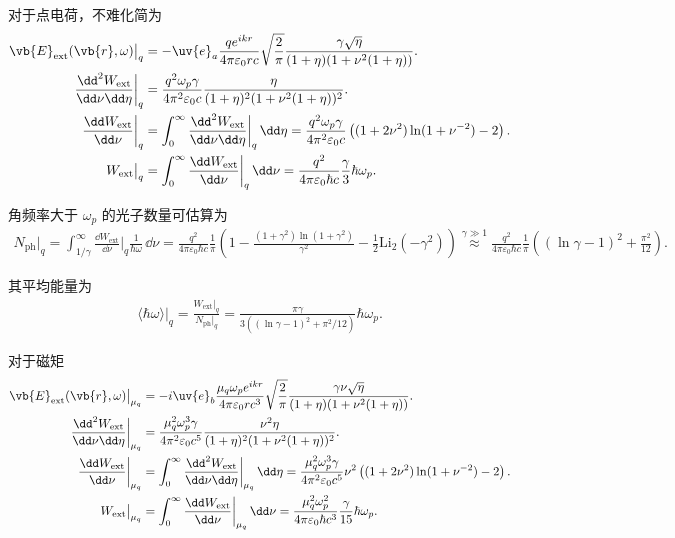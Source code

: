 对于点电荷，不难化简为
\begin{align*}
	\vb{E}_{\mathrm{ext}}(\vb{r}, \omega)\big|_{q} &= -\uv{e}_{a} \frac{q e^{i k r}}{4\pi \varepsilon_{0} r c} \sqrt{\frac{2}{\pi}} \frac{\gamma \sqrt{\eta}}{(1 + \eta) (1 + \nu^{2} (1 + \eta))}.\\\frac{\dd^{2} W_{\mathrm{ext}}}{\dd \nu \dd \eta}\bigg|_{q} &= \frac{q^{2} \omega_{p} \gamma}{4\pi^{2} \varepsilon_{0} c} \frac{\eta}{(1 + \eta)^{2} (1 + \nu^{2} (1 + \eta))^{2}}.\\\frac{\dd  W_{\mathrm{ext}}}{\dd \nu}\bigg|_{q} &= \int_{0}^{\infty} \frac{\dd^{2} W_{\mathrm{ext}}}{\dd \nu \dd \eta}\bigg|_{q} \, \dd \eta = \frac{q^{2} \omega_{p} \gamma}{4\pi^{2} \varepsilon_{0} c} \left( (1 + 2\nu^{2}) \ln(1 + \nu^{-2}) - 2 \right).\\W_{\mathrm{ext}}\big|_{q} &= \int_{0}^{\infty} \frac{\dd  W_{\mathrm{ext}}}{\dd \nu}\bigg|_{q} \, \dd \nu = \frac{q^{2}}{4\pi \varepsilon_{0} \hbar c} \frac{\gamma}{3} \hbar \omega_{p}.
\end{align*}

角频率大于 \(\omega_{p}\) 的光子数量可估算为
\begin{align*}
	N_{\mathrm{ph}}\big|_{q} = \int_{1/\gamma}^{\infty} \frac{\dd  W_{\mathrm{ext}}}{\dd \nu}\bigg|_{q} \frac{1}{\hbar \omega} \, \dd \nu = \frac{q^{2}}{4\pi \varepsilon_{0} \hbar c} \frac{1}{\pi} \left( 1 - \frac{(1 + \gamma^{2}) \ln(1 + \gamma^{2})}{\gamma^{2}} - \frac{1}{2} \mathrm{Li}_{2}(-\gamma^{2}) \right) \overset{\gamma \gg 1}{\approx} \frac{q^{2}}{4\pi \varepsilon_{0} \hbar c} \frac{1}{\pi} \left( (\ln \gamma - 1)^{2} + \frac{\pi^{2}}{12} \right).
\end{align*}

其平均能量为
\begin{align*}
	\langle \hbar\omega \rangle\big|_{q} = \frac{W_{\mathrm{ext}}|_{q}}{N_{\mathrm{ph}}|_{q}} = \frac{\pi \gamma}{3 \left( (\ln \gamma - 1)^{2} + \pi^2/12 \right)} \hbar\omega_{p}.
\end{align*}

对于磁矩
\begin{align*}
	\vb{E}_{\mathrm{ext}}(\vb{r}, \omega)\big|_{\mu_{q}} &= -i \uv{e}_{b} \frac{\mu_{q} \omega_{p} e^{i k r}}{4\pi \varepsilon_{0} r c^{3}} \sqrt{\frac{2}{\pi}} \frac{\gamma \nu \sqrt{\eta}}{(1 + \eta) (1 + \nu^{2} (1 + \eta))}.\\\frac{\dd^{2} W_{\mathrm{ext}}}{\dd \nu \dd \eta}\bigg|_{\mu_{q}} &= \frac{\mu_{q}^{2} \omega_{p}^{3} \gamma}{4\pi^{2} \varepsilon_{0} c^{5}} \frac{\nu^{2} \eta}{(1 + \eta)^{2} (1 + \nu^{2} (1 + \eta))^{2}}.\\\frac{\dd  W_{\mathrm{ext}}}{\dd \nu}\bigg|_{\mu_{q}} &= \int_{0}^{\infty} \frac{\dd^{2} W_{\mathrm{ext}}}{\dd \nu \dd \eta}\bigg|_{\mu_{q}} \, \dd \eta = \frac{\mu_{q}^{2} \omega_{p}^{3} \gamma}{4\pi^{2} \varepsilon_{0} c^{5}} \nu^{2} \left( (1 + 2\nu^{2}) \ln(1 + \nu^{-2}) - 2 \right).\\W_{\mathrm{ext}}\big|_{\mu_{q}} &= \int_{0}^{\infty} \frac{\dd  W_{\mathrm{ext}}}{\dd \nu}\bigg|_{\mu_{q}} \, \dd \nu = \frac{\mu_{q}^{2} \omega_{p}^{2}}{4\pi \varepsilon_{0} \hbar c^{3}} \frac{\gamma}{15} \hbar \omega_{p}.
\end{align*}

